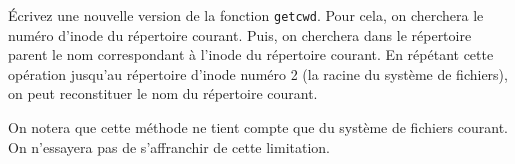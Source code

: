 \question

Écrivez une nouvelle version de la fonction {\tt getcwd}.  Pour cela,
on cherchera le numéro d'inode du répertoire courant.  Puis, on
cherchera dans le répertoire parent le nom correspondant à l'inode du
répertoire courant.  En répétant cette opération jusqu'au répertoire
d'inode numéro 2 (la racine du système de fichiers), on peut
reconstituer le nom du répertoire courant.

On notera que cette méthode ne tient compte que du système de fichiers
courant. On n'essayera pas de s'affranchir de cette limitation.


% 
% 

